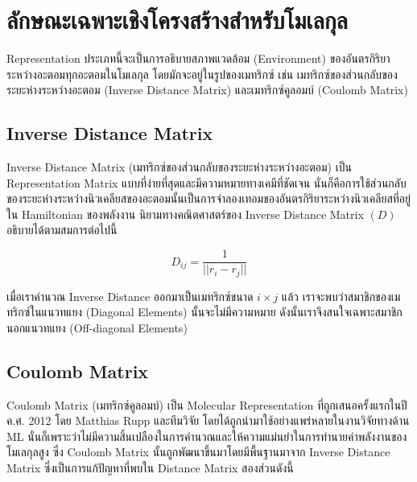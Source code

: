 \section{ลักษณะเฉพาะเชิงโครงสร้างสำหรับโมเลกุล}
\label{sec:struc_feat_mol}

Representation ประเภทนี้จะเป็นการอธิบายสภาพแวดล้อม (Environment) ของอันตรกิริยาระหว่างอะตอมทุกอะตอมในโมเลกุล โดยมักจะอยู่ในรูปของเมทริกซ์ เช่น เมทริกซ์ของส่วนกลับของระยะห่างระหว่างอะตอม (Inverse Distance Matrix) และเมทริกซ์คูลอมบ์ (Coulomb Matrix)

\subsection{Inverse Distance Matrix}
\label{ssec:inv_dist_mat}

Inverse Distance Matrix (เมทริกซ์ของส่วนกลับของระยะห่างระหว่างอะตอม) เป็น Representation Matrix แบบที่ง่ายที่สุดและมีความหมายทางเคมีที่ชัดเจน นั่นก็คือการใช้ส่วนกลับของระยะห่างระหว่างนิวเคลียสของอะตอมนั้นเป็นการจำลองเทอมของอันตรกิริยาระหว่างนิวเคลียสที่อยู่ใน Hamiltonian ของพลังงาน นิยามทางคณิตศาสตร์ของ Inverse Distance Matrix $(D)$ อธิบายได้ตามสมการต่อไปนี้

\begin{equation}
    D_{ij} = \frac{1}{||r_{i} - r_{j}||}
\end{equation}

เมื่อเราคำนวณ Inverse Distance ออกมาเป็นเมทริกซ์ขนาด $i \times j$ แล้ว เราจะพบว่าสมาชิกของเมทริกซ์ในแนวทแยง (Diagonal Elements) นั้นจะไม่มีความหมาย ดังนั้นเราจึงสนใจเฉพาะสมาชิกนอกแนวทแยง (Off-diagonal Elements)

\subsection{Coulomb Matrix}
\label{ssec:coulomb_mat}

Coulomb Matrix (เมทริกซ์คูลอมบ์) เป็น Molecular Representation ที่ถูกเสนอครั้งแรกในปี ค.ศ. 2012 โดย Matthias Rupp และทีมวิจัย\autocite{rupp2012} โดยได้ถูกนำมาใช้อย่างแพร่หลายในงานวิจัยทางด้าน ML นั่นก็เพราะว่าไม่มีความสิ้นเปลืองในการคำนวณและให้ความแม่นยำในการทำนายค่าพลังงานของโมเลกุลสูง ซึ่ง Coulomb Matrix นั้นถูกพัฒนาขึ้นมาโดยมีพื้นฐานมาจาก Inverse Distance Matrix ซึ่งเป็นการแก้ปัญหาที่พบใน Distance Matrix สองส่วนดังนี้

